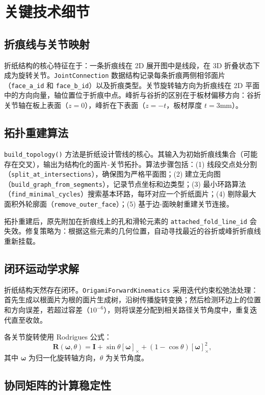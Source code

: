 \documentclass[12pt,a4paper,openany]{book}
\begin{document}
\section{关键技术细节}

\subsection{折痕线与关节映射}

折纸结构的核心特征在于：一条折痕线在 2D 展开图中是线段，在 3D 折叠状态下成为旋转关节。\texttt{JointConnection} 数据结构记录每条折痕两侧相邻面片（\texttt{face\_a\_id} 和 \texttt{face\_b\_id}）以及折痕类型。关节旋转轴方向为折痕线在 2D 平面中的方向向量，轴位置位于折痕中点。峰折与谷折的区别在于板材偏移方向：谷折关节轴在板上表面（\(z=0\)），峰折在下表面（\(z=-t\)，板材厚度 \(t=3\)mm）。

\subsection{拓扑重建算法}

\texttt{build\_topology()} 方法是折纸设计管线的核心。其输入为初始折痕线集合（可能存在交叉），输出为结构化的面片-关节拓扑。算法步骤包括：(1) 线段交点处分割（\texttt{split\_at\_intersections}），确保图为严格平面图；(2) 建立无向图（\texttt{build\_graph\_from\_segments}），记录节点坐标和边类型；(3) 最小环路算法（\texttt{find\_minimal\_cycles}）搜索基本环路，每环对应一个折纸面片；(4) 剔除最大面积外轮廓面（\texttt{remove\_outer\_face}）；(5) 基于边-面映射重建关节连接。

拓扑重建后，原先附加在折痕线上的孔和滑轮元素的 \texttt{attached\_fold\_line\_id} 会失效。修复策略为：根据这些元素的几何位置，自动寻找最近的谷折或峰折折痕线重新挂载。

\subsection{闭环运动学求解}

折纸结构天然存在闭环。\texttt{OrigamiForwardKinematics} 采用迭代约束松弛法处理：首先生成以根面片为根的面片生成树，沿树传播旋转变换；然后检测环边上的位置和方向误差，若超过容差（\(10^{-6}\)），则将误差分配到相关路径关节角度中，重复迭代直至收敛。

各关节旋转使用 Rodrigues 公式：
\[
\bm{R}(\bm{\omega}, \theta) = \bm{I} + \sin\theta [\bm{\omega}]_\times + (1 - \cos\theta) [\bm{\omega}]_\times^2,
\]
其中 \(\bm{\omega}\) 为归一化旋转轴方向，\(\theta\) 为关节角度。

\subsection{协同矩阵的计算稳定性}
\end{document}
